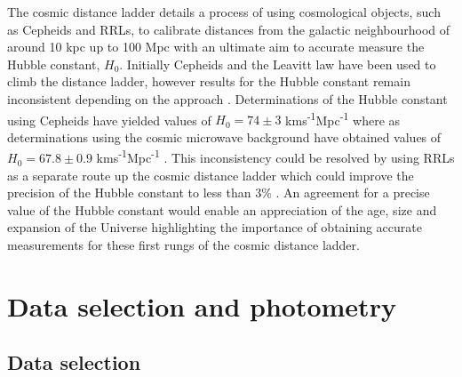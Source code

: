 \documentclass[11pt]{iopart}
\begin{document}
The cosmic distance ladder details a process of using cosmological objects, such as Cepheids and RRLs, to calibrate distances from the galactic neighbourhood of around 10 kpc up to 100 Mpc with an ultimate aim to accurate measure the Hubble constant, $H_{0}$. Initially Cepheids and the Leavitt law have been used to climb the distance ladder, however results for the Hubble constant remain inconsistent depending on the approach \cite{beaton2016}. Determinations of the Hubble constant using Cepheids have yielded values of $H_{0} = 74 \pm 3$ kms\textsuperscript{-1}Mpc\textsuperscript{-1} \cite{freedman2012hubble} where as determinations using the cosmic microwave background have obtained values of $H_{0} = 67.8 \pm 0.9$ kms\textsuperscript{-1}Mpc\textsuperscript{-1} \cite{planckcollab}. This inconsistency could be resolved by using RRLs as a separate route up the cosmic distance ladder which could improve the precision of the Hubble constant to less than 3\% \cite{beaton2016}. An agreement for a precise value of the Hubble constant would enable an appreciation of the age, size and expansion of the Universe \cite{freedman2001hubble} highlighting the importance of obtaining accurate measurements for these first rungs of the cosmic distance ladder.

\section{Data selection and photometry}
\label{dataselectionphot}

\subsection{Data selection}
\label{dataselection}
\end{document}
